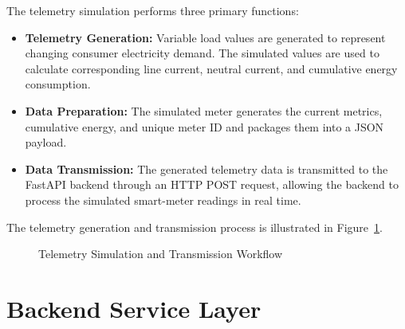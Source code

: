 The telemetry simulation performs three primary functions:

\begin{itemize}

\item \textbf{Telemetry Generation:} Variable load values are generated to represent changing consumer electricity demand. The simulated values are used to calculate corresponding line current, neutral current, and cumulative energy consumption.

\item \textbf{Data Preparation:} The simulated meter generates the current metrics, cumulative energy, and unique meter ID and packages them into a JSON payload.

\item \textbf{Data Transmission:} The generated telemetry data is transmitted to the FastAPI backend through an HTTP POST request, allowing the backend to process the simulated smart-meter readings in real time.

\end{itemize}

The telemetry generation and transmission process is illustrated in Figure~\ref{fig:telemetry-simulation}.

\begin{figure}[H]
\centering
{}
\caption{Telemetry Simulation and Transmission Workflow}
\label{fig:telemetry-simulation}
\end{figure}

\section{Backend Service Layer}

